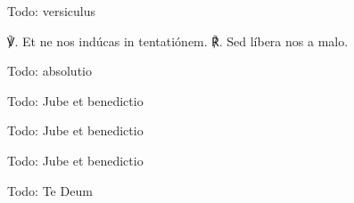 


\vfill \pagebreak



Todo: versiculus

℣. Et ne nos indúcas in tentatiónem. ℟. Sed líbera nos a malo.

Todo: absolutio


Todo: Jube et benedictio


\vfill \pagebreak


Todo: Jube et benedictio


\vfill \pagebreak


Todo: Jube et benedictio

Todo: Te Deum
